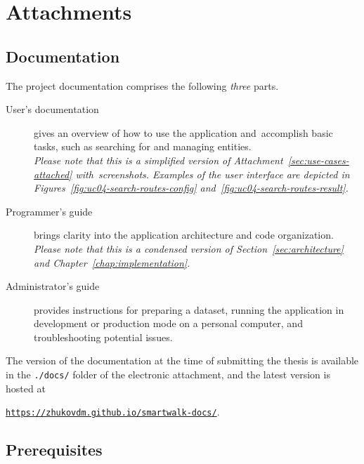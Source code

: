 \chapter{Attachments}

\section{Documentation}\label{sec:documentation}


The project documentation comprises the following \emph{three} parts.

\begin{description}
\item[User's documentation] gives an overview of how to use the application and~ac\-com\-plish basic tasks, such as searching for and managing entities.\\[0.2em] \emph{Please note that this is a simplified version of Attachment~\ref{sec:use-cases-attached} with~screen\-shots. Examples of the user interface are depicted in Figures~\ref{fig:uc04-search-routes-config} and~\ref{fig:uc04-search-routes-result}.}
\item[Programmer's guide] brings clarity into the application architecture and code organization.\\[0.2em]
\emph{Please note that this is a condensed version of Section~\ref{sec:architecture} and Chapter~\ref{chap:implementation}.}
\item[Administrator's guide] provides instructions for preparing a dataset, running the application in development or production mode on a personal computer, and troubleshooting potential issues.
\end{description}

The version of the documentation at the time of submitting the thesis is avail\-able in the \texttt{./docs/} folder of the electronic attachment, and the latest version is hosted at

\begin{center}
\texttt{\href{https://zhukovdm.github.io/smartwalk-docs/}{https://zhukovdm.github.io/smartwalk-docs/}}.
\end{center}

\section{Prerequisites}\label{sec:prerequisites}

